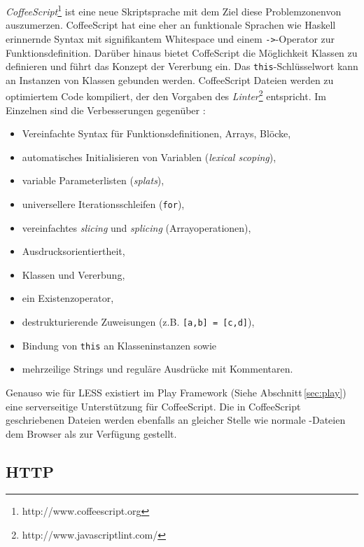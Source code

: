 \textit{CoffeeScript}\footnote{http://www.coffeescript.org} ist eine neue Skriptsprache mit dem Ziel
diese \glqq Problemzonen\grqq von  auszumerzen. CoffeeScript hat eine eher an funktionale
Sprachen wie Haskell erinnernde Syntax mit signifikantem Whitespace und einem \texttt{->}-Operator
zur Funktionsdefinition. Darüber hinaus bietet CoffeScript die Möglichkeit Klassen zu definieren und
führt das Konzept der Vererbung ein. Das \texttt{this}-Schlüsselwort kann an Instanzen von Klassen
gebunden werden. CoffeeScript Dateien werden zu optimiertem  Code kompiliert, der den
Vorgaben des \textit{ Linter}\footnote{http://www.javascriptlint.com/} entspricht. Im
Einzelnen sind die Verbesserungen gegenüber :

\begin{itemize}
  \item Vereinfachte Syntax für Funktionsdefinitionen, Arrays, Blöcke,
  \item automatisches Initialisieren von Variablen (\textit{lexical scoping}),
  \item variable Parameterlisten (\textit{splats}),
  \item universellere Iterationsschleifen (\texttt{for}),
  \item vereinfachtes \textit{slicing} und \textit{splicing} (Arrayoperationen),
  \item Ausdrucksorientiertheit,
  \item Klassen und Vererbung,
  \item ein Existenzoperator,
  \item destrukturierende Zuweisungen (z.B. \texttt{[a,b] = [c,d]}),
  \item Bindung von \texttt{this} an Klasseninstanzen sowie
  \item mehrzeilige Strings und reguläre Ausdrücke mit Kommentaren.
\end{itemize}

Genauso wie für LESS existiert im Play Framework (Siehe Abschnitt\,\ref{sec:play}) eine serverseitige
Unterstützung  für CoffeeScript. Die in CoffeeScript geschriebenen Dateien  werden ebenfalls an
gleicher Stelle wie normale -Dateien dem  Browser als  zur Verfügung gestellt.

\subsection{HTTP}


